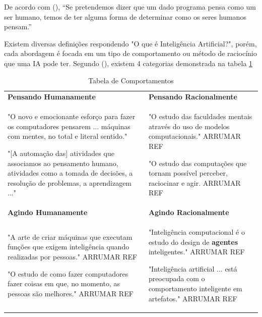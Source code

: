 \documentclass[
	12pt,				%
	openright,			%
	oneside,			%
	a4paper,			%
	english,			%
	spanish,			%
	brazil				%
	]{abntex2}
\begin{document}
	De acordo com \citeauthor{norvig} (\citeyear{norvig}), “Se pretendemos dizer que um dado programa pensa como um ser humano, temos de ter alguma forma de determinar como os seres humanos pensam.”
	
	Existem diversas definições respondendo "O que é Inteligência Artificial?", porém, cada abordagem é focada em um tipo de comportamento ou método de raciocínio que uma IA pode ter. Segundo \citeauthor{norvig} (\citeyear{norvig}), existem 4 categorias demonstrada na tabela \ref{Quatro Categorias}
	

\begin{table}[h]

\centering
{\renewcommand\arraystretch{1.25}
\begin{tabular}{|l|l|l|} \hline \toprule

\multicolumn{1}{p{7.5cm}|}{\textbf{Pensando Humanamente}} 
& 
\multicolumn{2}{p{7.5cm}|}{\textbf{Pensando Racionalmente}} \\

\multicolumn{1}{p{7.5cm}|}{
"O novo e emocionante esforço para fazer os computadores pensarem ... máquinas com mentes, no total e literal sentido." \cite{haugeland}

"[A automação das] atividades que associamos ao pensamento humano, atividades como a tomada de decisões, a resolução de problemas, a aprendizagem ..." \cite{bellman}

} 
& 
\multicolumn{2}{p{7.5cm}|}{

"O estudo das faculdades mentais através do uso de modelos computacionais." ARRUMAR REF \cite{norvig}

"O estudo das computações que tornam possível perceber, raciocinar e agir. ARRUMAR REF \cite{norvig}

} \\

\hline


\multicolumn{1}{p{7.5cm}|}{\textbf{Agindo Humanamente}} 
& 
\multicolumn{2}{p{7.5cm}|}{\textbf{Agindo Racionalmente}} \\ 

\multicolumn{1}{p{7.5cm}|}{

"A arte de criar máquinas que executam funções que exigem inteligência quando realizadas por pessoas." ARRUMAR REF\cite{norvig}

"O estudo de como fazer computadores fazer coisas em que, no momento, as pessoas são melhores." ARRUMAR REF\cite{norvig}

} 
& 
\multicolumn{2}{p{7.5cm}|}{

"Inteligência computacional é o estudo do design de \textbf{agentes} inteligentes." ARRUMAR REF\cite{norvig}

"Inteligência artificial ... está preocupada com o comportamento inteligente em artefatos." ARRUMAR REF \cite{norvig}

} \\ \hline


\end{tabular}}
\caption{Tabela de Comportamentos}
\label{Quatro Categorias}
\end{table}
	
\end{document}
